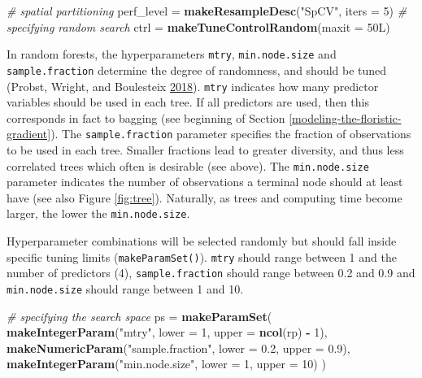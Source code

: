 \documentclass[]{krantz}
\newenvironment{Shaded}{\begin{snugshade}}{\end{snugshade}}
\newcommand{\CommentTok}[1]{\textcolor[rgb]{0.37,0.37,0.37}{\textit{#1}}}
\newcommand{\DataTypeTok}[1]{\textcolor[rgb]{0.27,0.27,0.27}{#1}}
\newcommand{\DecValTok}[1]{\textcolor[rgb]{0.06,0.06,0.06}{#1}}
\newcommand{\FloatTok}[1]{\textcolor[rgb]{0.06,0.06,0.06}{#1}}
\newcommand{\KeywordTok}[1]{\textcolor[rgb]{0.27,0.27,0.27}{\textbf{#1}}}
\newcommand{\NormalTok}[1]{#1}
\newcommand{\OperatorTok}[1]{\textcolor[rgb]{0.43,0.43,0.43}{\textbf{#1}}}
\newcommand{\StringTok}[1]{\textcolor[rgb]{0.5,0.5,0.5}{#1}}
\begin{document}
\begin{Shaded}
\begin{Highlighting}[]
\CommentTok{# spatial partitioning}
\NormalTok{perf_level =}\StringTok{ }\KeywordTok{makeResampleDesc}\NormalTok{(}\StringTok{"SpCV"}\NormalTok{, }\DataTypeTok{iters =} \DecValTok{5}\NormalTok{)}
\CommentTok{# specifying random search}
\NormalTok{ctrl =}\StringTok{ }\KeywordTok{makeTuneControlRandom}\NormalTok{(}\DataTypeTok{maxit =}\NormalTok{ 50L)}
\end{Highlighting}
\end{Shaded}

In random forests, the hyperparameters \texttt{mtry}, \texttt{min.node.size} and \texttt{sample.fraction} determine the degree of randomness, and should be tuned (Probst, Wright, and Boulesteix \protect\hyperlink{ref-probst_hyperparameters_2018}{2018}).
\texttt{mtry} indicates how many predictor variables should be used in each tree.
If all predictors are used, then this corresponds in fact to bagging (see beginning of Section \ref{modeling-the-floristic-gradient}).
The \texttt{sample.fraction} parameter specifies the fraction of observations to be used in each tree.
Smaller fractions lead to greater diversity, and thus less correlated trees which often is desirable (see above).
The \texttt{min.node.size} parameter indicates the number of observations a terminal node should at least have (see also Figure \ref{fig:tree}).
Naturally, as trees and computing time become larger, the lower the \texttt{min.node.size}.

Hyperparameter combinations will be selected randomly but should fall inside specific tuning limits (\texttt{makeParamSet()}).
\texttt{mtry} should range between 1 and the number of predictors (4), \texttt{sample.fraction} should range between 0.2 and 0.9 and \texttt{min.node.size} should range between 1 and 10.

\begin{Shaded}
\begin{Highlighting}[]
\CommentTok{# specifying the search space}
\NormalTok{ps =}\StringTok{ }\KeywordTok{makeParamSet}\NormalTok{(}
  \KeywordTok{makeIntegerParam}\NormalTok{(}\StringTok{"mtry"}\NormalTok{, }\DataTypeTok{lower =} \DecValTok{1}\NormalTok{, }\DataTypeTok{upper =} \KeywordTok{ncol}\NormalTok{(rp) }\OperatorTok{-}\StringTok{ }\DecValTok{1}\NormalTok{),}
  \KeywordTok{makeNumericParam}\NormalTok{(}\StringTok{"sample.fraction"}\NormalTok{, }\DataTypeTok{lower =} \FloatTok{0.2}\NormalTok{, }\DataTypeTok{upper =} \FloatTok{0.9}\NormalTok{),}
  \KeywordTok{makeIntegerParam}\NormalTok{(}\StringTok{"min.node.size"}\NormalTok{, }\DataTypeTok{lower =} \DecValTok{1}\NormalTok{, }\DataTypeTok{upper =} \DecValTok{10}\NormalTok{)}
\NormalTok{)}
\end{Highlighting}
\end{Shaded}
\end{document}
